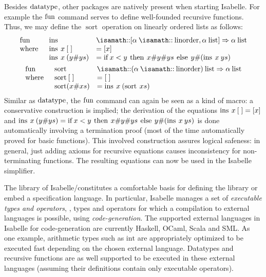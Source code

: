Besides ${\operatorname{datatype}}$, other packages are natively present when starting
Isabelle. For example the ${\operatorname{fun}}$ command serves to define well-founded
recursive
functions. Thus, we
may define the $\operatorname{sort}$ operation on linearly ordered
lists as follows:
\begin{gather*}
  \begin{array}{lll}
    \fun
    &\enspace\operatorname{ins} & \ofType
    [\alpha\ofType\mathrm{linorder}, \HolList{\alpha}]
    \Rightarrow
    \HolList{\alpha}\\
    \where
    &\enspace \operatorname{ins}\ap x \ap  [\;] &= [x]\\
    &\enspace \operatorname{ins}\ap x \ap (y\# ys)&=
    \HolIf x < y \ap
    \HolThen \ap x\#  y \# ys \ap
    \HolElse \ap y\#(\operatorname{ins} \ap x \ap ys)
 \end{array}\\
  \begin{array}{lll}
    \fun
    &\enspace\operatorname{sort} & \ofType
    \HolList{(\alpha\ofType\mathrm{linorder})}
    \Rightarrow
    \HolList{\alpha}\\
    \where
    &\enspace \operatorname{sort}\ap [\;] &= [\;]\\
    &\enspace \operatorname{sort} (x\# xs)&=
    \operatorname{ins}\ap x\ap (\operatorname{sort}\ap xs)
   \end{array}
\end{gather*}
Similar as ${\operatorname{datatype}}$, the ${\operatorname{fun}}$ command can again be seen as a kind
of macro: a conservative construction is implied; the derivation of
the equations $\operatorname{ins}\: x \: [\;] = [x]$ and
$\operatorname{ins}\: x \: (y\# ys) = \operatorname{if} x < y \: \operatorname{then} \:
x\# y \# ys \: \operatorname{else} \: y\#(\operatorname{ins} \: x \: ys)$ is
done automatically involving a termination proof (most of the time
automatically proved for basic functions). This involved construction
assures logical safeness: in general, just adding axioms for recursive
equations causes inconsistency for non-terminating functions. The
resulting equations can now be used in the Isabelle simplifier.

The library of Isabelle/\HOL constitutes a comfortable basis for
defining the \OCL library or embed a specification language.  In
particular, Isabelle manages a set of \emph{executable types and
  operators}, \ie, types and operators for which a compilation to
external languages is possible, using
\emph{code-generation}. The
supported external languages in Isabelle for code-generation are
currently Haskell, OCaml, Scala and
SML. As one example, arithmetic types such as $\text{int}$ are
appropriately optimized to be executed fast depending on the chosen
external language. Datatypes and recursive functions are as well
supported to be executed in these external languages (assuming their
definitions contain only executable operators).

